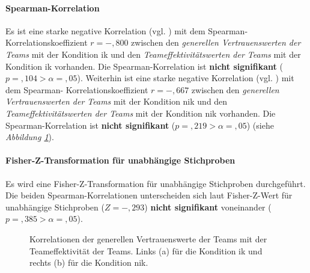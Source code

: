 \documentclass[a4paper,11pt]{article}%
\renewcommand{\\}{\vspace*{0.5\baselineskip} \newline}
\begin{document}
{\paragraph{Spearman-Korrelation}
Es ist eine starke negative Korrelation (vgl. \citep[S. 77-81]{cohen2013statistical}) mit dem Spearman-Korrelationskoeffizient $r = -,800$ zwischen den \textit{generellen Vertrauenswerten der Teams} mit der Kondition \ac{ik} und den \textit{Teameffektivitätswerten der Teams} mit der Kondition \newline \ac{ik} vorhanden. Die Spearman-Korrelation ist \textbf{nicht signifikant} ($p =,104 > \alpha = ,05$).\\
Weiterhin ist eine starke negative Korrelation (vgl. \citep[S. 77-81]{cohen2013statistical}) mit dem Spearman- Korrelationskoeffizient $r = -,667$ zwischen den \textit{generellen Vertrauenswerten der Teams} mit der Kondition \ac{nik} und den \textit{Teameffektivitätswerten der Teams} mit der Kondition \newline \ac{nik} vorhanden. Die Spearman-Korrelation ist \textbf{nicht signifikant} ($p =,219 > \alpha = ,05$) (siehe \textit{Abbildung \ref{H5_Korrelation_Auswertung}}). 

\paragraph{Fisher-Z-Transformation für unabhängige Stichproben}
Es wird eine Fisher-Z-Transformation für unabhängige Stichproben durchgeführt.
Die beiden Spearman-Korrelationen unterscheiden sich laut Fisher-Z-Wert für unabhängige Stichproben ($Z=-,293$) \textbf{nicht signifikant} voneinander ($p =,385 > \alpha = ,05$).
\begin{figure}[h]
  \centering
  \qquad
  \caption[Korrelationen der generellen Vertrauenswerte der Teams mit der Teameffektivität der Teams]{Korrelationen der generellen Vertrauenswerte der Teams mit der Teameffektivität der Teams. Links (a) für die Kondition \ac{ik} und rechts (b) für die Kondition \ac{nik}.}
  \label{H5_Korrelation_Auswertung}
\end{figure}

}
\end{document}
